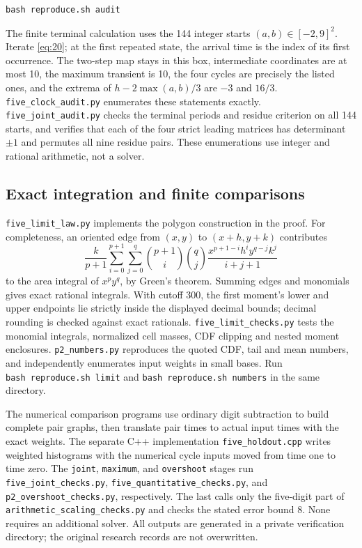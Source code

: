 \documentclass[11pt]{amsart}
\begin{document}
\begin{verbatim}
bash reproduce.sh audit
\end{verbatim}

The finite terminal calculation uses the 144 integer starts \((a,b)\in[-2,9]^2\). Iterate \eqref{eq:20}; at the first repeated state, the arrival time is the index of its first occurrence. The two-step map stays in this box, intermediate coordinates are at most 10, the maximum transient is 10, the four cycles are precisely the listed ones, and the extrema of \(h-2\max(a,b)/3\) are \(-3\) and \(16/3\). \texttt{five\_clock\_audit.py} enumerates these statements exactly. \texttt{five\_joint\_audit.py} checks the terminal periods and residue criterion on all 144 starts, and verifies that each of the four strict leading matrices has determinant \(\pm1\) and permutes all nine residue pairs. These enumerations use integer and rational arithmetic, not a solver.

\subsection{Exact integration and finite comparisons}

\texttt{five\_limit\_law.py} implements the polygon construction in the proof. For completeness, an oriented edge from \((x,y)\) to \((x+h,y+k)\) contributes \[\frac{k}{p+1}\sum_{i=0}^{p+1}\sum_{j=0}^{q}
 \binom{p+1}{i}\binom qj
 \frac{x^{p+1-i}h^i y^{q-j}k^j}{i+j+1}\] to the area integral of \(x^p y^q\), by Green's theorem. Summing edges and monomials gives exact rational integrals. With cutoff 300, the first moment's lower and upper endpoints lie strictly inside the displayed decimal bounds; decimal rounding is checked against exact rationals. \texttt{five\_limit\_checks.py} tests the monomial integrals, normalized cell masses, CDF clipping and nested moment enclosures. \texttt{p2\_numbers.py} reproduces the quoted CDF, tail and mean numbers, and independently enumerates input weights in small bases. Run \texttt{bash\ reproduce.sh\ limit} and \texttt{bash\ reproduce.sh\ numbers} in the same directory.

The numerical comparison programs use ordinary digit subtraction to build complete pair graphs, then translate pair times to actual input times with the exact weights. The separate C++ implementation \texttt{five\_holdout.cpp} writes weighted histograms with the numerical cycle inputs moved from time one to time zero. The \texttt{joint}, \texttt{maximum}, and \texttt{overshoot} stages run \texttt{five\_joint\_checks.py}, \texttt{five\_quantitative\_checks.py}, and \texttt{p2\_overshoot\_checks.py}, respectively. The last calls only the five-digit part of \texttt{arithmetic\_scaling\_checks.py} and checks the stated error bound 8. None requires an additional solver. All outputs are generated in a private verification directory; the original research records are not overwritten.
\end{document}
